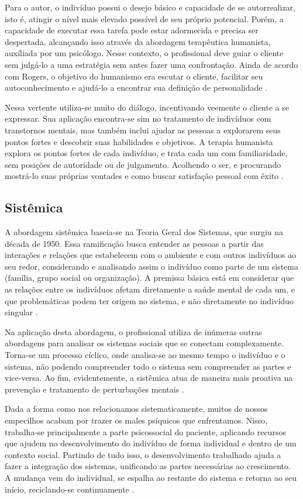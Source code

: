 Para o autor, o indivíduo possui o desejo básico e capacidade de se autorrealizar, isto é, atingir o nível mais elevado possível de seu próprio potencial. Porém, a capacidade de executar essa tarefa pode estar adormecida e precisa ser despertada, alcançando isso através da abordagem terapêutica humanista, auxíliada por um psicólogo. Nesse contexto, o profissional deve guiar o cliente sem julgá-lo a uma estratégia sem antes fazer uma confrontação. Ainda de acordo com Rogers, o objetivo do humanismo era escutar o cliente, facilitar seu autoconhecimento e ajudá-lo a encontrar sua definição de personalidade \cite{Pimenta2019}.

Nessa vertente utiliza-se muito do diálogo, incentivando veemente o cliente a se expressar. Sua aplicação encontra-se sim no tratamento de indivíduos com transtornos mentais, mas também inclui ajudar as pessoas a explorarem seus pontos fortes e descobrir suas habilidades e objetivos. A terapia humanista explora os pontos fortes de cada indivíduo, e trata cada um com familiaridade, sem posições de autoridade ou de julgamento. Acolhendo o ser, e procurando mostrá-lo suas próprias vontades e como buscar satisfação pessoal com êxito \cite{Brandao2023}.

\subsection{Sistêmica}
\label{sec:sistemica}
A abordagem sistêmica baseia-se na Teoria Geral dos Sistemas, que surgiu na década de 1950. Essa ramificação busca entender as pessoas a partir das interações e relações que estabelecem com o ambiente e com outros indivíduos ao seu redor, considerando e analisando assim o indivíduo como parte de um sistema (família, grupo social ou organização). A premissa básica está em considerar que as relações entre os indivíduos afetam diretamente a saúde mental de cada um, e que problemáticas podem ter origem no sistema, e não diretamente no indivíduo singular \cite{Verissimo2020}.

Na aplicação desta abordagem, o profissional utiliza de inúmeras outras abordagens para analisar os sistemas sociais que se conectam complexamente. Torna-se um processo cíclico, onde analisa-se ao mesmo tempo o indivíduo e o sistema, não podendo compreender todo o sistema sem compreender as partes e vice-versa. Ao fim, evidentemente, a sistêmica atua de maneira mais proativa na prevenção e tratamento de perturbações mentais \cite{Psychotherapy2009}. 

Dada a forma como nos relacionamos sistematicamente, muitos de nossos empecilhos acabam por trazer os males psíquicos que enfrentamos. Nisso, trabalha-se principalmente a parte psicossocial do paciente, aplicando recursos que ajudem no desenvolvimento do indivíduo de forma individual e dentro de um contexto social. Partindo de tudo isso, o desenvolvimento trabalhado ajuda a fazer a integração dos sistemas, unificando as partes necessárias ao crescimento. A mudança vem do individual, se espalha ao restante do sistema e retorna ao seu início, reciclando-se continuamente \cite{Verissimo2020}.

